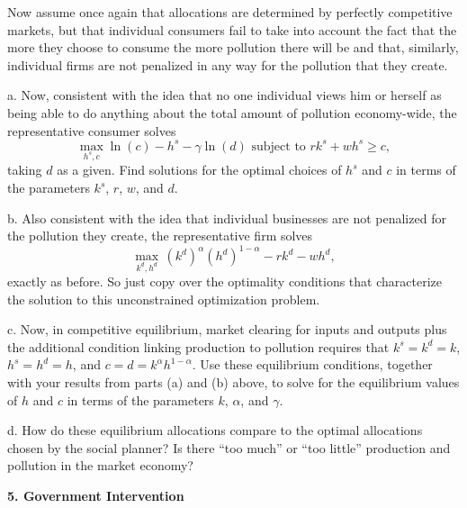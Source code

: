 \documentclass[12pt]{article}
\begin{document}
Now assume once again that allocations are determined by perfectly competitive markets, but that individual consumers fail to take into account the fact that the more they choose to consume the more pollution there will be and that, similarly, individual firms are not penalized in any way for the pollution that they create.
\begin{description}
\item a. Now, consistent with the idea that no one individual views him or herself as being able to do anything about the total amount of pollution economy-wide, the representative consumer solves
$$
\max_{h^{s},c} \ln(c) - h^{s} - \gamma \ln(d) \text{ subject to } rk^{s} + wh^{s} \geq c,
$$
taking $d$ as a given. Find solutions for the optimal choices of $h^{s}$ and $c$ in terms of the parameters $k^{s}$, $r$, $w$, and $d$.
\item b. Also consistent with the idea that individual businesses are not penalized for the pollution they create, the representative firm solves
$$
\max_{k^{d},h^{d}} \, (k^{d})^{\alpha}(h^{d})^{1-\alpha} - rk^{d} - wh^{d},
$$
exactly as before. So just copy over the optimality conditions that characterize the solution to this unconstrained optimization problem.
\item c. Now, in competitive equilibrium, market clearing for inputs and outputs plus the additional condition linking production to pollution requires that $k^{s}=k^{d}=k$, $h^{s}=h^{d}=h$, and $c=d=k^{\alpha}h^{1-\alpha}$. Use these equilibrium conditions, together with your results from parts (a) and (b) above, to solve for the equilibrium values of $h$ and $c$ in terms of the parameters $k$, $\alpha$, and $\gamma$.
\item d. How do these equilibrium allocations compare to the optimal allocations chosen by the social planner? Is there ``too much'' or ``too little'' production and pollution in the market economy?
\end{description}

{\bfseries 5. Government Intervention}
\end{document}
